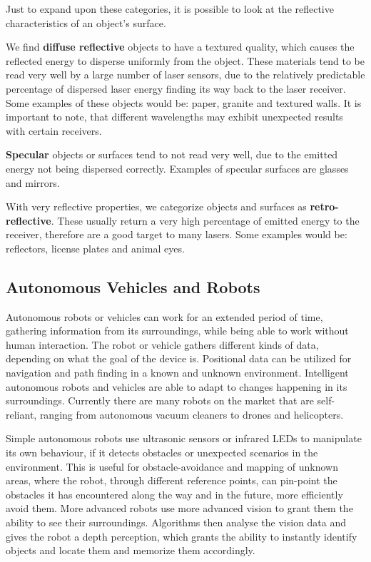 Just to expand upon these categories, it is possible to look at the reflective characteristics of an object's surface.

We find \textbf{diffuse reflective} objects to have a textured quality, which causes the reflected energy to disperse uniformly from the object. These materials tend to be read very well by a large number of laser sensors, due to the relatively predictable percentage of dispersed laser energy finding its way back to the laser receiver. Some examples of these objects would be: paper, granite and textured walls. It is important to note, that different wavelengths may exhibit unexpected results with certain receivers.

\textbf{Specular} objects or surfaces tend to not read very well, due to the emitted energy not being dispersed correctly. Examples of specular surfaces are glasses and mirrors.

With very reflective properties, we categorize objects and surfaces as \textbf{retro-reflective}. These usually return a very high percentage of emitted energy to the receiver, therefore are a good target to many lasers. Some examples would be: reflectors, license plates and animal eyes.

\subsection{Autonomous Vehicles and Robots}

Autonomous robots or vehicles can work for an extended period of time, gathering information from its surroundings, while being able to work without human interaction. The robot or vehicle gathers different kinds of data, depending on what the goal of the device is. Positional data can be utilized for navigation and path finding in a known and unknown environment. Intelligent autonomous robots and vehicles are able to adapt to changes happening in its surroundings. Currently there are many robots on the market that are self-reliant, ranging from autonomous vacuum cleaners to drones and helicopters\cite{autonomousbasic}.

Simple autonomous robots use ultrasonic sensors or infrared LEDs to manipulate its own behaviour, if it detects obstacles or unexpected scenarios in the environment. This is useful for obstacle-avoidance and mapping of unknown areas, where the robot, through different reference points, can pin-point the obstacles it has encountered along the way and in the future, more efficiently avoid them.
More advanced robots use more advanced vision to grant them the ability to see their surroundings. Algorithms then analyse the vision data and gives the robot a depth perception, which grants the ability to instantly identify objects and locate them and memorize them accordingly\cite{obstacles}.

